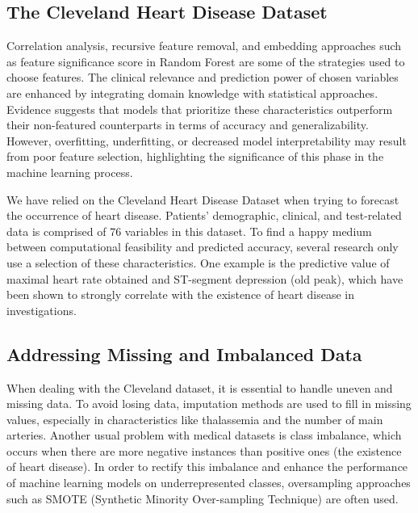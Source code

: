 \subsection{The Cleveland Heart Disease Dataset}
Correlation analysis, recursive feature removal, and embedding approaches such as feature significance score in Random Forest are some of the strategies used to choose features. The clinical relevance and prediction power of chosen variables are enhanced by integrating domain knowledge with statistical approaches. Evidence suggests that models that prioritize these characteristics outperform their non-featured counterparts in terms of accuracy and generalizability. However, overfitting, underfitting, or decreased model interpretability may result from poor feature selection, highlighting the significance of this phase in the machine learning process.

We have relied on the Cleveland Heart Disease Dataset when trying to forecast the occurrence of heart disease. Patients' demographic, clinical, and test-related data is comprised of 76 variables in this dataset. To find a happy medium between computational feasibility and predicted accuracy, several research only use a selection of these characteristics. One example is the predictive value of maximal heart rate obtained and ST-segment depression (old peak), which have been shown to strongly correlate with the existence of heart disease in investigations.

\subsection{Addressing Missing and Imbalanced Data}
When dealing with the Cleveland dataset, it is essential to handle uneven and missing data. To avoid losing data, imputation methods are used to fill in missing values, especially in characteristics like thalassemia and the number of main arteries. Another usual problem with medical datasets is class imbalance, which occurs when there are more negative instances than positive ones (the existence of heart disease). In order to rectify this imbalance and enhance the performance of machine learning models on underrepresented classes, oversampling approaches such as SMOTE (Synthetic Minority Over-sampling Technique) are often used.

